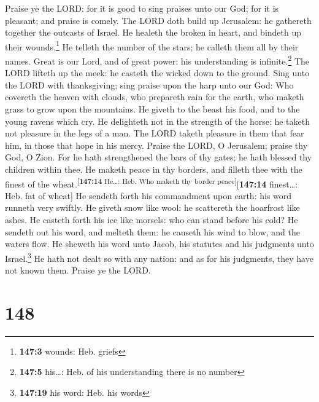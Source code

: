  Praise ye the LORD: for it is good to sing praises unto
our God; for it is pleasant; and praise is comely.  The
LORD doth build up Jerusalem: he gathereth together the outcasts of
Israel.  He healeth the broken in heart, and bindeth up
their wounds.\footnote{\textbf{147:3} wounds: Heb. griefs}
 He telleth the number of the stars; he calleth them all
by their names.  Great is our Lord, and of great power:
his understanding is infinite.\footnote{\textbf{147:5} his\ldots: Heb.
  of his understanding there is no number}  The LORD
lifteth up the meek: he casteth the wicked down to the ground.
 Sing unto the LORD with thanksgiving; sing praise upon
the harp unto our God:  Who covereth the heaven with
clouds, who prepareth rain for the earth, who maketh grass to grow upon
the mountains.  He giveth to the beast his food, and to
the young ravens which cry.  He delighteth not in the
strength of the horse: he taketh not pleasure in the legs of a man.
 The LORD taketh pleasure in them that fear him, in those
that hope in his mercy.  Praise the LORD, O Jerusalem;
praise thy God, O Zion.  For he hath strengthened the
bars of thy gates; he hath blessed thy children within thee.
 He maketh peace in thy borders, and filleth thee with
the finest of the wheat.\textsuperscript{{[}\textbf{147:14} He\ldots:
Heb. Who maketh thy border peace{]}}{[}\textbf{147:14} finest\ldots:
Heb. fat of wheat{]}  He sendeth forth his commandment
upon earth: his word runneth very swiftly.  He giveth
snow like wool: he scattereth the hoarfrost like ashes. 
He casteth forth his ice like morsels: who can stand before his cold?
 He sendeth out his word, and melteth them: he causeth
his wind to blow, and the waters flow.  He sheweth his
word unto Jacob, his statutes and his judgments unto Israel.\footnote{\textbf{147:19}
  his word: Heb. his words}  He hath not dealt so with
any nation: and as for his judgments, they have not known them. Praise
ye the LORD.

\hypertarget{section-149}{%
\section{148}\label{section-149}}

